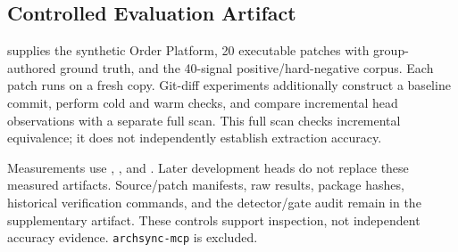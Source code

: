 \subsection{Controlled Evaluation Artifact}

 supplies the synthetic Order Platform, 20 executable patches with group-authored ground truth, and the 40-signal positive/hard-negative corpus. Each patch runs on a fresh copy. Git-diff experiments additionally construct a baseline commit, perform cold and warm checks, and compare incremental head observations with a separate full scan. This full scan checks incremental equivalence; it does not independently establish extraction accuracy.

Measurements use , , and . Later development heads do not replace these measured artifacts. Source/patch manifests, raw results, package hashes, historical verification commands, and the detector/gate audit remain in the supplementary artifact. These controls support inspection, not independent accuracy evidence. \texttt{archsync-mcp} is excluded.
